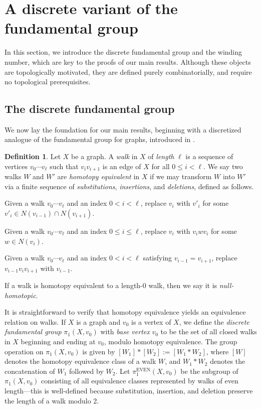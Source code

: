 \documentclass[12pt,letterpaper]{amsart}
\theoremstyle{definition}
\newtheorem{definition}[theorem]{Definition}
\theoremstyle{remark}
\newcommand{\pieven}{\pi_1^{\mathrm{EVEN}}}
\begin{document}
\section{A discrete variant of the fundamental group}\label{sec:discrete}

In this section, we introduce the discrete fundamental group and the winding number, which are key to the proofs of our main results. Although these objects are topologically motivated, they are defined purely combinatorially, and require no topological prerequisites.

\subsection{The discrete fundamental group}\label{sec:discrete-pi1}
We now lay the foundation for our main results, beginning with a discretized analogue of the fundamental group for graphs, introduced in \cite{San}.

\begin{definition}\label{def:homotopy}
Let $X$ be a graph. A \emph{walk} in $X$ of \emph{length} $\ell$ is a sequence of vertices $v_0\cdots v_\ell$ such that $v_iv_{i+1}$ is an edge of $X$ for all $0\leq i<\ell$. We say two walks $W$ and $W'$ are \emph{homotopy equivalent} in $X$ if we may transform $W$ into $W'$ via a finite sequence of \emph{substitutions}, \emph{insertions}, and \emph{deletions}, defined as follows.
\begin{homtenum}
\item[(Sub)] Given a walk $v_0\cdots v_\ell$ and an index $0<i<\ell$, replace $v_i$ with $v'_i$ for some $v'_i\in N(v_{i-1})\cap N(v_{i+1})$. 
\item[(Ins)] Given a walk $v_0\cdots v_\ell$ and an index $0\leq i\leq \ell$, replace $v_i$ with $v_iwv_i$ for some $w\in N(v_i)$.
\item[(Del)] Given a walk $v_0\cdots v_\ell$ and an index $0<i<\ell$ satisfying $v_{i-1}=v_{i+1}$, replace $v_{i-1}v_iv_{i+1}$ with $v_{i-1}$.
\end{homtenum}
%
If a walk is homotopy equivalent to a length-$0$ walk, then we say it is \emph{null-homotopic}. 
\end{definition}

It is straightforward to verify that homotopy equivalence yields an equivalence relation on walks. If $X$ is a graph and $v_0$ is a vertex of $X$, we define the \emph{discrete fundamental group} $\pi_1(X,v_0)$ with \emph{base vertex} $v_0$ to be the set of all closed walks in $X$ beginning and ending at $v_0$, modulo homotopy equivalence. The group operation on $\pi_1(X,v_0)$ is given by $[W_1]*[W_2]:=[W_1*W_2]$, where $[W]$ denotes the homotopy equivalence class of a walk $W$, and $W_1*W_2$ denotes the concatenation of $W_1$ followed by $W_2$. 
Let $\pieven(X,v_0)$ be the subgroup of $\pi_1(X,v_0)$ consisting of all equivalence classes represented by walks of even length---this is well-defined because substitution, insertion, and deletion preserve the length of a walk modulo 2.  
\end{document}
